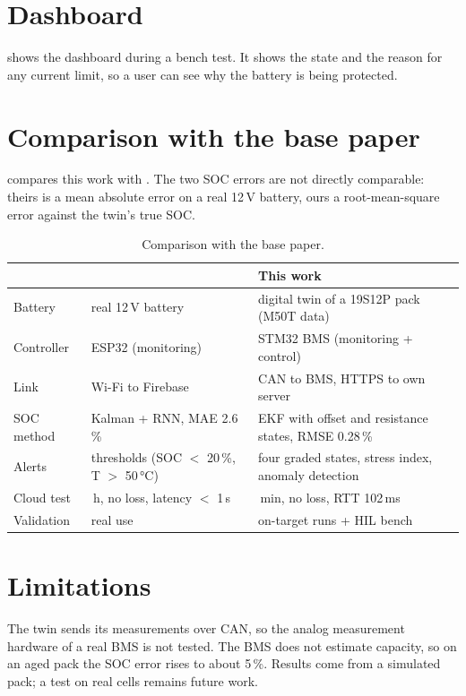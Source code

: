 \section{Dashboard}
 shows the dashboard during a bench test. It shows the state and the reason for any current limit, so a user can see why the battery is being protected.


\section{Comparison with the base paper}
 compares this work with \citet{nejakar2025}. The two SOC errors are not directly comparable: theirs is a mean absolute error on a real 12\,V battery, ours a root-mean-square error against the twin's true SOC.

\begin{table}[htbp]\centering\small
\caption{Comparison with the base paper.}\label{tab:cmp}
\begin{tabularx}{\linewidth}{@{}l>{\raggedright\arraybackslash}X>{\raggedright\arraybackslash}X@{}}\toprule
 & \citet{nejakar2025} & This work \\\midrule
Battery & real 12\,V battery & digital twin of a 19S12P pack (M50T data) \\
Controller & ESP32 (monitoring) & STM32 BMS (monitoring + control) \\
Link & Wi-Fi to Firebase & CAN to BMS, HTTPS to own server \\
SOC method & Kalman + RNN, MAE 2.6\,\% & EKF with offset and resistance states, RMSE 0.28\,\% \\
Alerts & thresholds (SOC $<$ 20\,\%, T $>$ 50\,°C) & four graded states, stress index, anomaly detection \\
Cloud test & 48\,h, no loss, latency $<$ 1\,s & 30\,min, no loss, RTT 102\,ms \\
Validation & real use & 1000 on-target runs + HIL bench \\\bottomrule
\end{tabularx}
\end{table}

\section{Limitations}
The twin sends its measurements over CAN, so the analog measurement hardware of a real BMS is not tested. The BMS does not estimate capacity, so on an aged pack the SOC error rises to about 5\,\%. Results come from a simulated pack; a test on real cells remains future work.
